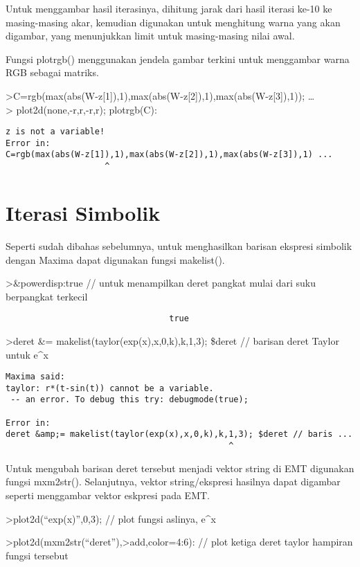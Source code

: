 \documentclass[
]{book}
\begin{document}
Untuk menggambar hasil iterasinya, dihitung jarak dari hasil iterasi ke-10 ke masing-masing akar, kemudian digunakan untuk menghitung warna yang akan digambar, yang menunjukkan limit untuk masing-masing nilai awal.

Fungsi plotrgb() menggunakan jendela gambar terkini untuk menggambar warna RGB sebagai matriks.

\textgreater C=rgb(max(abs(W-z{[}1{]}),1),max(abs(W-z{[}2{]}),1),max(abs(W-z{[}3{]}),1)); \ldots{}\\
\textgreater{} plot2d(none,-r,r,-r,r); plotrgb(C):

\begin{verbatim}
z is not a variable!
Error in:
C=rgb(max(abs(W-z[1]),1),max(abs(W-z[2]),1),max(abs(W-z[3]),1) ...
                    ^
\end{verbatim}

\chapter{Iterasi Simbolik}\label{iterasi-simbolik}

Seperti sudah dibahas sebelumnya, untuk menghasilkan barisan ekspresi simbolik dengan Maxima dapat digunakan fungsi makelist().

\textgreater\&powerdisp:true // untuk menampilkan deret pangkat mulai dari suku berpangkat terkecil

\begin{verbatim}
                                 true
\end{verbatim}

\textgreater deret \&= makelist(taylor(exp(x),x,0,k),k,1,3); \$deret // barisan deret Taylor untuk e\^{}x

\begin{verbatim}
Maxima said:
taylor: r*(t-sin(t)) cannot be a variable.
 -- an error. To debug this try: debugmode(true);

Error in:
deret &amp;= makelist(taylor(exp(x),x,0,k),k,1,3); $deret // baris ...
                                             ^
\end{verbatim}

Untuk mengubah barisan deret tersebut menjadi vektor string di EMT digunakan fungsi mxm2str(). Selanjutnya, vektor string/ekspresi hasilnya dapat digambar seperti menggambar vektor eskpresi pada EMT.

\textgreater plot2d(``exp(x)'',0,3); // plot fungsi aslinya, e\^{}x

\textgreater plot2d(mxm2str(``deret''),\textgreater add,color=4:6): // plot ketiga deret taylor hampiran fungsi tersebut
\end{document}
